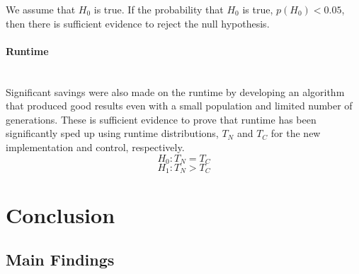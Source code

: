 \documentclass{article}
\newcommand{\myparagraph}[1]{\paragraph{#1}\mbox{}\\}
\begin{document}
We assume that $H_0$ is true. If the probability that $H_0$ is true, $p(H_0) < 0.05$, then there is sufficient evidence to reject the null hypothesis.

\myparagraph{Runtime}
Significant savings were also made on the runtime by developing an algorithm that produced good results even with a small population and limited number of generations. These is sufficient evidence to prove that runtime has been significantly sped up using runtime distributions, $T_N$ and $T_C$ for the new implementation and control, respectively.
\[H_0: T_N = T_C\]
\[H_1: T_N > T_C\]


\section{Conclusion} %
\subsection{Main Findings}



\end{document}
